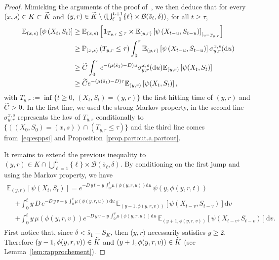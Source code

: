 \documentclass[AHL,Unicode,longabstracts,published]{cedram}
\newcommand{\PP}{\mathbb{P}}
\newcommand{\EE}{\mathbb{E}}
\newcommand{\clB}{\mathcal{B}}
\newcommand{\dif}{\mathrm{d}}
\newcommand{\SmaxK}{S_K}
\newcommand{\barmu}{\mu(\bar s_1)}
\newcommand{\1}{\mathbf{1}}
\let\oldtilde\tilde
\renewcommand*{\tilde}[1]{\mathchoice{\widetilde{#1}}{\widetilde{#1}}{\oldtilde{#1}}{\oldtilde{#1}}}
\begin{document}
\begin{proof}
Mimicking the arguments of the proof of~\cite[Theorem~1.1]{CG20}, we then deduce that for every $(x,s) \in K \subset \tilde K$ and $(y,r)\in \tilde K \setminus (\bigcup_{\ell= 1}^{L+1} \{\ell\} \times \clB(\bar s_\ell, \delta))$, for all $t\geq \tau$,
\begin{equation}\label{eq:presqueA4}
\begin{split}
\EE_{(x,s)} \left[\psi \left(X_t, S_t\right)\right] &\geq \EE_{(x,s)} \left[\1_{T_{y,r} \,\leq\,\tau} \times \EE_{(y,r)}\left[\psi\left(X_{t- u}, S_{t- u}\right)\right]_{\vert_{u=T_{y,r}}}\right]\\
&\geq \PP_{(x,s)}\left(T_{y,r} \leq \tau \right) \int_0^\tau \EE_{(y,r)}\left[\psi\left(X_{t- u}, S_{t-u}\right)\right] \sigma^{x,s}_{y,r}(\dif u)\\
&\geq \tilde C\int_0^\tau e^{-(\barmu-D) u} \sigma^{x,s}_{y,r}(\dif u) \EE_{(y,r)} \left[\psi (X_t, S_t)\right]\\
&\geq \tilde C e^{-(\barmu-D) \tau} \EE_{(y,r)} \left[\psi (X_t, S_t)\right], 
\end{split}
\end{equation}
with $T_{y,r}:=\inf\{t\geq 0, \, (X_t,S_t)=(y,r)\}$ the first hitting time of $(y,r)$ and $\tilde C>0$. In the first line, we used the strong Markov property, in the second line $\sigma^{x,s}_{y,r}$ represents the law of $T_{y,r}$ conditionally to $\{((X_0,S_0)=(x,s)) \cap (T_{y,r}\leq \tau)\}$ and the third line comes from~\eqref{eq:esppsi} and Proposition~\ref{prop.partout.a.partout}.


It remains to extend the previous inequality to $(y,r) \in K \cap \bigcup_{\ell= 1}^L \{\ell\} \times \clB(\bar s_\ell, \delta)$. By conditioning on the first jump and using the Markov property, we have
\begin{multline}\label{eq:duhamel}
\EE_{(y,r)} \left[\psi (X_t, S_t)\right]= e^{-D\,y \,t - y\,\int_0^t \mu (\phi(y,r,u)) \dif u} \,\psi\left(y, \phi(y,r,t)\right)\\
\begin{aligned}
&+ \int_0^t y\,D \,e^{-D \,y \,v - y\,\int_0^v \mu (\phi(y,r,u)) \dif u}\, \EE_{(y-1, \phi(y,r,v))} \left[\psi (X_{t-v}, S_{t-v})\right] \dif v\\
&+ \int_0^t y\,\mu (\phi(y,r,v)) e^{-D\, y\, v - y\, \int_0^v \mu (\phi(y,r,u)) \dif u} \, \EE_{(y+1, \phi(y,r,v))} \left[\psi (X_{t-v}, S_{t-v})\right] \dif v.
\end{aligned}
\end{multline}
First notice that, since $\delta<\bar s_1- \SmaxK$, then ($y,r)$ necessarily satisfies $y\geq 2$. Therefore $(y-1, \phi(y,r,v))\in \tilde K$ and $(y+1, \phi(y,r,v))\in \tilde K$ (see Lemma~\ref{lem:rapprochement}).


\end{proof}
\end{document}
